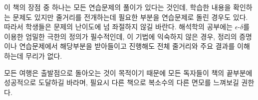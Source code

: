 이 책의 장점 중 하나는 모든 연습문제의 풀이가 있다는 것인데,
학습한 내용을 확인하는 문제도 있지만
줄거리를 전개하는데 필요한 부분을 연습문제로 돌린 경우도 있다.
따라서 학생들은 문제의 난이도에 넘 좌절하지 않길 바란다.
해석학의 공부에는 $\epsilon$-$\delta$를 이용한 엄밀한 극한의 정의가
필수적인데, 이 기법에 익숙하지 않은 경우, 정리의 증명이나 연습문제에서 
해당부분을 받아들이고 진행해도 전체 줄거리와 주요 결과를 이해하는데 무리가 없다.

모든 여행은 출발점으로 돌아오는 것이 목적이기 때문에
모든 독자들이 책의 끝부분에 성공적으로 도달하길 바라며,
필요시 다른 책으로 복소수의 다른 면모를 느껴보길 권한다.




\clearpage





